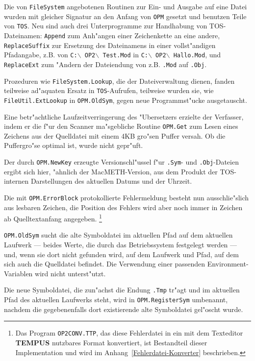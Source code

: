 \medskip
Die von {\tt FileSystem} angebotenen Routinen zur Ein- und Ausgabe auf eine
Datei wurden mit gleicher Signatur an den Anfang von {\tt OPM} gesetzt
und benutzen Teile von {\tt TOS}.
Neu sind auch drei Unterprogramme zur Handhabung von TOS-Dateinamen:
{\tt Append} zum Anh"angen einer Zeichenkette an eine andere,
{\tt ReplaceSuffix} zur Ersetzung des Dateinamens in einer vollst"andigen
Pfadangabe, z.B. von {\tt C:$\backslash$ OP2$\backslash$ Test.Mod} in
{\tt C:$\backslash$ OP2$\backslash$ Hallo.Mod}, und
{\tt ReplaceExt} zum "Andern der Dateiendung von z.B. {\tt .Mod} auf
{\tt .Obj}.

Prozeduren wie {\tt FileSystem.Lookup}, die der Dateiverwaltung dienen,
fanden teilweise ad"aquaten Ersatz in {\tt TOS}-Aufrufen, teilweise
wurden sie, wie {\tt FileUtil.ExtLookup} in {\tt OPM.OldSym}, gegen neue
Programmst"ucke ausgetauscht.

Eine betr"achtliche Laufzeitverringerung des "Ubersetzers erzielte der
Verfasser, indem er die f"ur den Scanner ma"sgebliche Routine {\tt OPM.Get}
zum Lesen eines Zeichens aus der Quelldatei mit einem 4KB gro"sen Puffer
versah.
Ob die Puffergro"se optimal ist, wurde nicht gepr"uft.

Der durch {\tt OPM.NewKey} erzeugte Versionschl"ussel f"ur {\tt .Sym}- und
{\tt .Obj}-Dateien ergibt sich hier, "ahnlich der MacMETH-Version, aus dem
Produkt der TOS-internen Darstellungen des aktuellen Datums und der Uhrzeit.

Die mit {\tt OPM.ErrorBlock} protokollierte Fehlermeldung besteht nun
ausschlie"slich aus lesbaren Zeichen, die Position des Fehlers wird aber
noch immer in Zeichen ab Quelltextanfang angegeben.%
\footnote{Das Program {\tt OP2CONV.TTP}, das diese Fehlerdatei in ein mit dem Texteditor
{\bf TEMPUS} nutzbares Format konvertiert, ist Bestandteil dieser
Implementation und wird im Anhang~\ref{Fehlerdatei-Konverter} beschrieben.}

{\tt OPM.OldSym} sucht die alte Symboldatei im aktuellen Pfad auf dem
aktuellen Laufwerk --- beides Werte, die durch das Betriebssystem festgelegt
werden --- und, wenn sie dort nicht gefunden wird, auf dem Laufwerk und Pfad,
auf dem sich auch die Quelldatei befindet.
Die Verwendung einer passenden Environment-Variablen wird nicht unterst"utzt.

Die neue Symboldatei, die zun"achst die Endung {\tt .Tmp} tr"agt und im
aktuellen Pfad des aktuellen Laufwerks steht, wird in {\tt OPM.RegisterSym}
umbenannt, nachdem die gegebenenfalls dort existierende alte Symboldatei
gel"oscht wurde.

